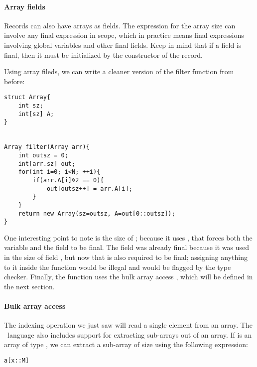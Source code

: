\paragraph{Array fields}
Records can also have arrays as fields. The expression for the array size can involve any final expression in scope, which in practice means final expressions involving global variables and other final fields. Keep in mind that if a field is final, then it must be initialized by the constructor of the record. 

\begin{Example}
Using array fileds, we can write a cleaner version of the filter function from before:
\begin{lstlisting}
struct Array{
	int sz;
	int[sz] A;
}


Array filter(Array arr){
	int outsz = 0;
	int[arr.sz] out;
	for(int i=0; i<N; ++i){
		if(arr.A[i]%2 == 0){
			out[outsz++] = arr.A[i];
		}
	}
	return new Array(sz=outsz, A=out[0::outsz]);
}
\end{lstlisting}
One interesting point to note is the size of ; because it uses , that forces both the variable  and the field  to be final. The field  was already final because it was used in the size of field , but now that  is also required to be final; assigning anything to it inside the function would be illegal and would be flagged by the type checker. Finally, the function uses the bulk array access , which will be defined in the next section.
\end{Example}







\paragraph{Bulk array access}
The indexing operation we just saw will read a single element from an array. The \SK\ language also includes support for extracting sub-arrays out of an array. If  is an array of type , we can extract a sub-array of size  using the following expression: 
\begin{lstlisting}
a[x::M]
\end{lstlisting}


